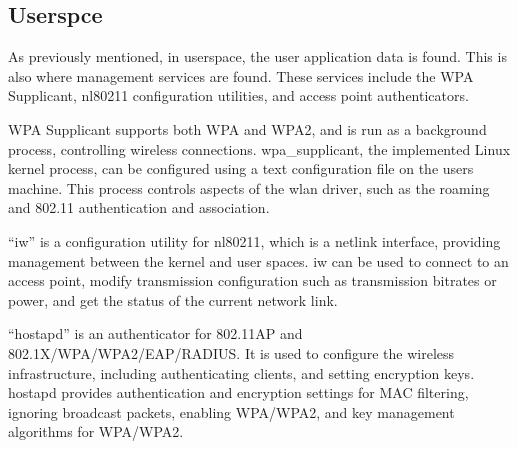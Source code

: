 \subsection{Userspce}

As previously mentioned, in userspace, the user application data is found. This
is also where management services are found. These services include
the WPA Supplicant, nl80211 configuration utilities, and access point
authenticators\cite{chou_2015}.

WPA Supplicant supports both WPA and WPA2, and is run as a background process,
controlling wireless connections. wpa\_supplicant, the implemented Linux kernel
process, can be configured using a text configuration file on the users machine.
This process controls aspects of the wlan driver, such as the roaming and 802.11
authentication and association\cite{wpa_supplicant}.

``iw'' is a configuration utility for nl80211, which is a netlink interface,
providing management between the kernel and user spaces. iw can be used to
connect to an access point, modify transmission configuration such as
transmission bitrates or power, and get the status of the current network
link\cite{iw}.

``hostapd'' is an authenticator for 802.11AP and 802.1X/WPA/WPA2/EAP/RADIUS. It
is used to configure the wireless infrastructure, including authenticating
clients, and setting encryption keys. hostapd provides authentication and
encryption settings for MAC filtering, ignoring broadcast packets, enabling
WPA/WPA2, and key management algorithms for WPA/WPA2\cite{hostapd}.
